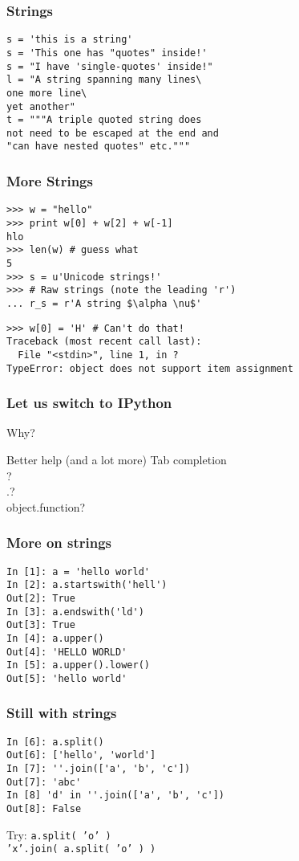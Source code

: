 \documentclass[14pt,compress]{beamer}
\begin{document}
\begin{frame}[fragile]
  \frametitle{Strings}
  \begin{lstlisting}
s = 'this is a string'
s = 'This one has "quotes" inside!'
s = "I have 'single-quotes' inside!"
l = "A string spanning many lines\
one more line\
yet another"
t = """A triple quoted string does
not need to be escaped at the end and 
"can have nested quotes" etc."""
  \end{lstlisting}
\end{frame}

\begin{frame}[fragile]
  \frametitle{More Strings}
  \vspace*{-0.2in}
  \begin{lstlisting}
>>> w = "hello"    
>>> print w[0] + w[2] + w[-1]
hlo
>>> len(w) # guess what
5
>>> s = u'Unicode strings!'
>>> # Raw strings (note the leading 'r')
... r_s = r'A string $\alpha \nu$'
  \end{lstlisting}
\pause
  \begin{lstlisting}
>>> w[0] = 'H' # Can't do that!
Traceback (most recent call last):
  File "<stdin>", line 1, in ?
TypeError: object does not support item assignment
  \end{lstlisting}
\end{frame}

\begin{frame}
  \frametitle{Let us switch to IPython}
  Why?
  \begin{block}
    {Better help (and a lot more)}
    Tab completion\\
    ?\\
    .?\\
    object.function?
  \end{block}
\end{frame}

\begin{frame}[fragile]
  \frametitle{More on strings}
  \begin{lstlisting}
In [1]: a = 'hello world'
In [2]: a.startswith('hell')
Out[2]: True
In [3]: a.endswith('ld')
Out[3]: True
In [4]: a.upper()
Out[4]: 'HELLO WORLD'
In [5]: a.upper().lower()
Out[5]: 'hello world'
  \end{lstlisting}
\end{frame}

\begin{frame}[fragile]\frametitle{Still with strings}
  \begin{lstlisting}
In [6]: a.split()
Out[6]: ['hello', 'world']
In [7]: ''.join(['a', 'b', 'c'])
Out[7]: 'abc'
In [8] 'd' in ''.join(['a', 'b', 'c'])
Out[8]: False
  \end{lstlisting}
  \begin{block}{Try:}
    \texttt{a.split( 'o' )}\\
    \texttt{'x'.join( a.split( 'o' ) )}
  \end{block}
\end{frame}
\end{document}
